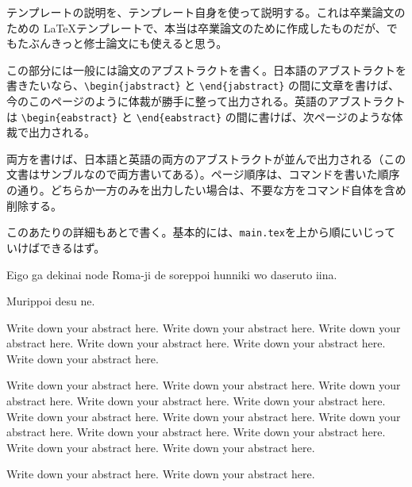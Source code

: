


\begin{jabstract}

テンプレートの説明を、テンプレート自身を使って説明する。これは卒業論文のための
\LaTeX テンプレートで、本当は卒業論文のために作成したものだが、でもたぶんきっと修士論文にも使えると思う。

この部分には一般には論文のアブストラクトを書く。日本語のアブストラクトを書きたいなら、\verb|\begin{jabstract}| と \verb|\end{jabstract}| の間に文章を書けば、今のこのページのように体裁が勝手に整って出力される。英語のアブストラクトは \verb|\begin{eabstract}| と \verb|\end{eabstract}| の間に書けば、次ページのような体裁で出力される。

両方を書けば、日本語と英語の両方のアブストラクトが並んで出力される（この文書はサンブルなので両方書いてある）。ページ順序は、コマンドを書いた順序の通り。どちらか一方のみを出力したい場合は、不要な方をコマンド自体を含め削除する。

このあたりの詳細もあとで書く。基本的には、{\tt main.tex}を上から順にいじっていけばできるはず。

\end{jabstract}



\begin{eabstract}

Eigo ga dekinai node Roma-ji de soreppoi hunniki wo daseruto iina.

Murippoi desu ne.

Write down your abstract here. Write down your abstract here. Write down your abstract here. Write down your abstract here. Write down your abstract here. Write down your abstract here.

 Write down your abstract here. Write down your abstract here. Write down your abstract here. Write down your abstract here. Write down your abstract here. Write down your abstract here. Write down your abstract here. Write down your abstract here. Write down your abstract here. Write down your abstract here. Write down your abstract here. Write down your abstract here.

Write down your abstract here. Write down your abstract here.

\end{eabstract}